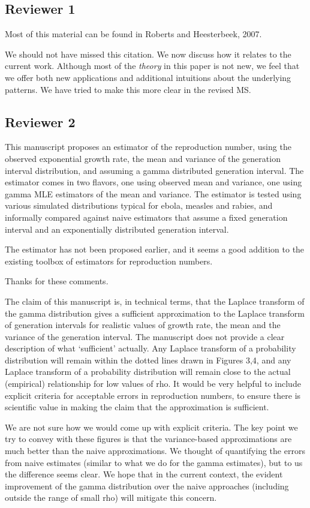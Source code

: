 \documentclass[12pt]{article}
\newcommand{\rev}{\subsection*}
\newcommand{\revtext}{\textsf}
\begin{document}
\rev{Reviewer 1}

\revtext{Most of this material can be found in Roberts and Heesterbeek, 2007.}

We should not have missed this citation. We now discuss how it relates to the current work. Although most of the \emph{theory} in this paper is not new, we feel that we offer both new applications and additional intuitions about the underlying patterns. We have tried to make this more clear in the revised MS.

\rev{Reviewer 2}

\revtext{This manuscript proposes an estimator of the reproduction number, using the observed exponential growth rate, the mean and variance of the generation interval distribution, and assuming a gamma distributed generation interval. The estimator comes in two flavors, one using observed mean and variance, one using gamma MLE estimators of the mean and variance. The estimator is tested using various simulated distributions typical for ebola, measles and rabies, and informally compared against naive estimators that assume a fixed generation interval and an exponentially distributed generation interval.}

\revtext{The estimator has not been proposed earlier, and it seems a good addition to the existing toolbox of estimators for reproduction numbers.}

Thanks for these comments.

\revtext{The claim of this manuscript is, in technical terms, that the Laplace transform of the gamma distribution gives a sufficient approximation to the Laplace transform of generation intervals for realistic values of growth rate, the mean and the variance of the generation interval. The manuscript does not provide a clear description of what `sufficient’ actually. Any Laplace transform of a probability distribution will remain within the dotted lines drawn in Figures 3,4, and any Laplace transform of a probability distribution will remain close to the actual (empirical) relationship for low values of rho. It would be very helpful to include explicit criteria for acceptable errors in reproduction numbers, to ensure there is scientific value in making the claim that the approximation is sufficient.}

We are not sure how we would come up with explicit criteria. The key point we try to convey with these figures is that the variance-based approximations are much better than the naive approximations. We thought of quantifying the errors from naive estimates (similar to what we do for the gamma estimates), but to us the difference seems clear. We hope that in the current context, the evident improvement of the gamma distribution over the naive approaches (including outside the range of small rho) will mitigate this concern.
\end{document}
